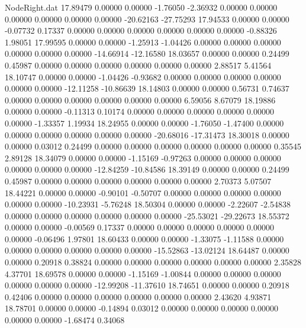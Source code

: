 \begin{filecontents}{NodeRight.dat}
  17.89479    0.00000    0.00000    -1.76050   -2.36932    0.00000    0.00000    0.00000    0.00000    0.00000    0.00000  -20.62163  -27.75293
  17.94533    0.00000    0.00000    -0.07732    0.17337    0.00000    0.00000    0.00000    0.00000    0.00000    0.00000   -0.88326    1.98051
  17.99595    0.00000    0.00000    -1.25913   -1.04426    0.00000    0.00000    0.00000    0.00000    0.00000    0.00000  -14.66914  -12.16580
  18.03657    0.00000    0.00000     0.24499    0.45987    0.00000    0.00000    0.00000    0.00000    0.00000    0.00000    2.88517    5.41564
  18.10747    0.00000    0.00000    -1.04426   -0.93682    0.00000    0.00000    0.00000    0.00000    0.00000    0.00000  -12.11258  -10.86639
  18.14803    0.00000    0.00000     0.56731    0.74637    0.00000    0.00000    0.00000    0.00000    0.00000    0.00000    6.59056    8.67079
  18.19886    0.00000    0.00000    -0.11313    0.10174    0.00000    0.00000    0.00000    0.00000    0.00000    0.00000   -1.33357    1.19934
  18.24955    0.00000    0.00000    -1.76050   -1.47400    0.00000    0.00000    0.00000    0.00000    0.00000    0.00000  -20.68016  -17.31473
  18.30018    0.00000    0.00000     0.03012    0.24499    0.00000    0.00000    0.00000    0.00000    0.00000    0.00000    0.35545    2.89128
  18.34079    0.00000    0.00000    -1.15169   -0.97263    0.00000    0.00000    0.00000    0.00000    0.00000    0.00000  -12.84259  -10.84586
  18.39149    0.00000    0.00000     0.24499    0.45987    0.00000    0.00000    0.00000    0.00000    0.00000    0.00000    2.70373    5.07507
  18.44221    0.00000    0.00000    -0.90101   -0.50707    0.00000    0.00000    0.00000    0.00000    0.00000    0.00000  -10.23931   -5.76248
  18.50304    0.00000    0.00000    -2.22607   -2.54838    0.00000    0.00000    0.00000    0.00000    0.00000    0.00000  -25.53021  -29.22673
  18.55372    0.00000    0.00000    -0.00569    0.17337    0.00000    0.00000    0.00000    0.00000    0.00000    0.00000   -0.06496    1.97801
  18.60433    0.00000    0.00000    -1.33075   -1.11588    0.00000    0.00000    0.00000    0.00000    0.00000    0.00000  -15.52863  -13.02124
  18.64487    0.00000    0.00000     0.20918    0.38824    0.00000    0.00000    0.00000    0.00000    0.00000    0.00000    2.35828    4.37701
  18.69578    0.00000    0.00000    -1.15169   -1.00844    0.00000    0.00000    0.00000    0.00000    0.00000    0.00000  -12.99208  -11.37610
  18.74651    0.00000    0.00000     0.20918    0.42406    0.00000    0.00000    0.00000    0.00000    0.00000    0.00000    2.43620    4.93871
  18.78701    0.00000    0.00000    -0.14894    0.03012    0.00000    0.00000    0.00000    0.00000    0.00000    0.00000   -1.68474    0.34068

\end{filecontents}
